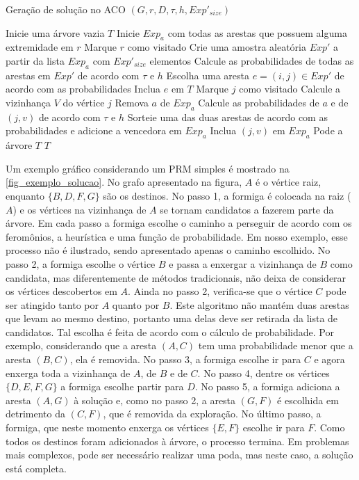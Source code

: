 \begin{algorithm}
	\caption{Geração de solução no ACO $(G, r, D, \tau, h, Exp'_{size})$}
	\label{alg_aco_prm_construir_solucao}
	\begin{algorithmic}[1]
		\State Inicie uma árvore vazia $T$
		\State Inicie $Exp_a$ com todas as arestas que possuem alguma extremidade em $r$
		\State Marque $r$ como visitado
		\State Crie uma amostra aleatória $Exp'$ a partir da lista $Exp_a$ com $Exp'_{size}$ elementos
		\State Calcule as probabilidades de todas as arestas em $Exp'$ de acordo com $\tau$ e $h$
		\State Escolha uma aresta $e=(i,j) \in Exp'$ de acordo com as probabilidades
		\State Inclua $e$ em $T$
		\State Marque $j$ como visitado
		\State Calcule a vizinhança $V$ do vértice $j$
		\State Remova $a$ de $Exp_a$
		\State Calcule as probabilidades de $a$ e de $(j, v)$ de acordo com $\tau$ e $h$
		\State Sorteie uma das duas arestas de acordo com as probabilidades e adicione a vencedora em $Exp_a$
		\State Inclua $(j, v)$ em $Exp_a$
		\EndIf
		\EndFor
		\EndWhile
		\State Pode a árvore $T$
		\State \Return $T$
	\end{algorithmic}
\end{algorithm}

Um exemplo gráfico considerando um PRM simples é mostrado na \autoref{fig_exemplo_solucao}. No grafo apresentado na figura, $A$ é o vértice raiz, enquanto $\{B, D, F, G\}$ são os destinos. No passo 1, a formiga é colocada na raiz ($A$) e os vértices na vizinhança de $A$ se tornam candidatos a fazerem parte da árvore. Em cada passo a formiga escolhe o caminho a perseguir de acordo com os feromônios, a heurística e uma função de probabilidade. Em nosso exemplo, esse processo não é ilustrado, sendo apresentado apenas o caminho escolhido. No passo 2, a formiga escolhe o vértice $B$ e passa a enxergar a vizinhança de $B$ como candidata, mas diferentemente de métodos tradicionais, não deixa de considerar os vértices descobertos em $A$. Ainda no passo 2, verifica-se que o vértice $C$ pode ser atingido tanto por $A$ quanto por $B$. Este algoritmo não mantém duas arestas que levam ao mesmo destino, portanto uma delas deve ser retirada da lista de candidatos. Tal escolha é feita de acordo com o cálculo de probabilidade. Por exemplo, considerando que a aresta $(A, C)$ tem uma probabilidade menor que a aresta $(B, C)$, ela é  removida. No passo 3, a formiga escolhe ir para $C$ e agora enxerga toda a vizinhança de $A$, de $B$ e de $C$. No passo 4, dentre os vértices $\{D, E, F, G\}$ a formiga escolhe partir para $D$. No passo 5, a formiga adiciona a aresta $(A, G)$ à solução e, como no passo 2, a aresta $(G, F)$ é escolhida em detrimento da $(C, F)$, que é removida da exploração. No último passo, a formiga, que neste momento enxerga os vértices $\{E, F\}$ escolhe ir para $F$. Como todos os destinos foram adicionados à árvore, o processo termina. Em problemas mais complexos, pode ser necessário realizar uma poda, mas neste caso, a solução está completa.

